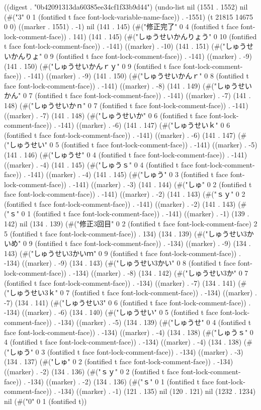 
((digest . "0b42091313da60385ee34cf1f33b9d44") (undo-list nil (1551 . 1552) nil (#("3" 0 1 (fontified t face font-lock-variable-name-face)) . -1551) (t 21815 14675 0 0) ((marker . 1551) . -1) nil (141 . 145) (#("修正完了" 0 4 (fontified t face font-lock-comment-face)) . 141) (141 . 145) (#("しゅうせいかんりょう" 0 10 (fontified t face font-lock-comment-face)) . -141) ((marker) . -10) (141 . 151) (#("しゅうせいかんりょ" 0 9 (fontified t face font-lock-comment-face)) . -141) ((marker) . -9) (141 . 150) (#("しゅうせいかんｒｙ" 0 9 (fontified t face font-lock-comment-face)) . -141) ((marker) . -9) (141 . 150) (#("しゅうせいかんｒ" 0 8 (fontified t face font-lock-comment-face)) . -141) ((marker) . -8) (141 . 149) (#("しゅうせいかん" 0 7 (fontified t face font-lock-comment-face)) . -141) ((marker) . -7) (141 . 148) (#("しゅうせいかｎ" 0 7 (fontified t face font-lock-comment-face)) . -141) ((marker) . -7) (141 . 148) (#("しゅうせいか" 0 6 (fontified t face font-lock-comment-face)) . -141) ((marker) . -6) (141 . 147) (#("しゅうせいｋ" 0 6 (fontified t face font-lock-comment-face)) . -141) ((marker) . -6) (141 . 147) (#("しゅうせい" 0 5 (fontified t face font-lock-comment-face)) . -141) ((marker) . -5) (141 . 146) (#("しゅうせ" 0 4 (fontified t face font-lock-comment-face)) . -141) ((marker) . -4) (141 . 145) (#("しゅうｓ" 0 4 (fontified t face font-lock-comment-face)) . -141) ((marker) . -4) (141 . 145) (#("しゅう" 0 3 (fontified t face font-lock-comment-face)) . -141) ((marker) . -3) (141 . 144) (#("しゅ" 0 2 (fontified t face font-lock-comment-face)) . -141) ((marker) . -2) (141 . 143) (#("ｓｙ" 0 2 (fontified t face font-lock-comment-face)) . -141) ((marker) . -2) (141 . 143) (#("ｓ" 0 1 (fontified t face font-lock-comment-face)) . -141) ((marker) . -1) (139 . 142) nil (134 . 139) (#("修正3回目" 0 2 (fontified t face font-lock-comment-face) 2 5 (fontified t face font-lock-comment-face)) . 134) (134 . 139) (#("しゅうせい3かいめ" 0 9 (fontified t face font-lock-comment-face)) . -134) ((marker) . -9) (134 . 143) (#("しゅうせい3かいｍ" 0 9 (fontified t face font-lock-comment-face)) . -134) ((marker) . -9) (134 . 143) (#("しゅうせい3かい" 0 8 (fontified t face font-lock-comment-face)) . -134) ((marker) . -8) (134 . 142) (#("しゅうせい3か" 0 7 (fontified t face font-lock-comment-face)) . -134) ((marker) . -7) (134 . 141) (#("しゅうせい3ｋ" 0 7 (fontified t face font-lock-comment-face)) . -134) ((marker) . -7) (134 . 141) (#("しゅうせい3" 0 6 (fontified t face font-lock-comment-face)) . -134) ((marker) . -6) (134 . 140) (#("しゅうせい" 0 5 (fontified t face font-lock-comment-face)) . -134) ((marker) . -5) (134 . 139) (#("しゅうせ" 0 4 (fontified t face font-lock-comment-face)) . -134) ((marker) . -4) (134 . 138) (#("しゅうｓ" 0 4 (fontified t face font-lock-comment-face)) . -134) ((marker) . -4) (134 . 138) (#("しゅう" 0 3 (fontified t face font-lock-comment-face)) . -134) ((marker) . -3) (134 . 137) (#("しゅ" 0 2 (fontified t face font-lock-comment-face)) . -134) ((marker) . -2) (134 . 136) (#("ｓｙ" 0 2 (fontified t face font-lock-comment-face)) . -134) ((marker) . -2) (134 . 136) (#("ｓ" 0 1 (fontified t face font-lock-comment-face)) . -134) ((marker) . -1) (121 . 135) nil (120 . 121) nil (1232 . 1234) nil (#("0" 0 1 (fontified t)) 